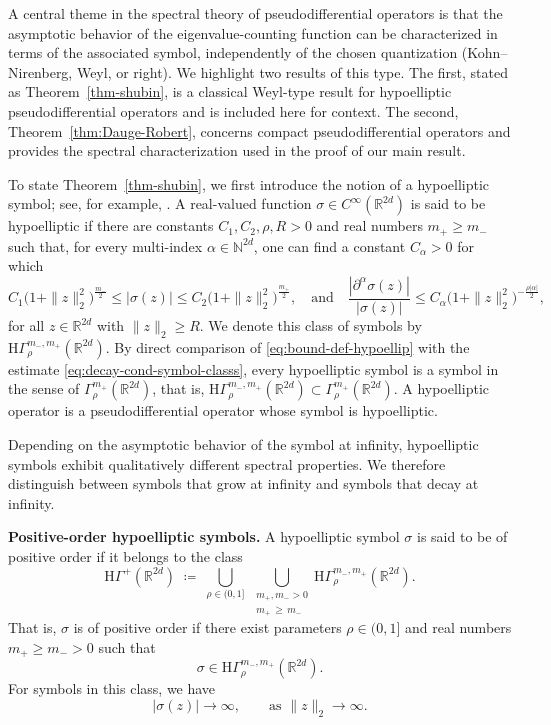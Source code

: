 \documentclass[a4paper,12pt]{article}
\newcommand{\N}{\mathbb{N}}
\newcommand{\R}{\mathbb{R}}
\newcommand{\hyposymbclass}{\text{H}\Gamma^{m_-,m_+}_\rho}
\newcommand{\hypoposclass}{\mathrm{H}\Gamma^+}
\begin{document}
A central theme in the spectral theory of pseudodifferential operators is that the
asymptotic behavior of the eigenvalue-counting function can be characterized in
terms of the associated symbol, independently of the chosen quantization
(Kohn--Nirenberg, Weyl, or right).
We highlight two results of this type.
The first, stated as Theorem~\ref{thm-shubin}, is a classical Weyl-type result for
hypoelliptic pseudodifferential operators and is included here for context.
The second, Theorem~\ref{thm:Dauge-Robert}, concerns compact pseudodifferential
operators and provides the spectral characterization used in the proof of our
main result.

To state Theorem~\ref{thm-shubin}, we first introduce the notion of a
hypoelliptic symbol; see, for example,
\cite[Definition~25.1]{shubin_pseudodifferential_2001}.
A real-valued function $\sigma\in C^\infty(\R^{2d})$ is said to be hypoelliptic if
there are constants $C_1,C_2,\rho,R>0$ and real numbers $m_+\ge m_-$ such that,
for every multi-index $\alpha\in\N^{2d}$, one can find a constant $C_\alpha>0$
for which
\begin{equation}\label{eq:bound-def-hypoellip}
    C_1\bigl(1+\|z\|_2^2\bigr)^{\frac{m_-}{2}}
    \le
    |\sigma(z)|
    \le
    C_2\bigl(1+\|z\|_2^2\bigr)^{\frac{m_+}{2}},
    \quad\text{and}\quad
    \frac{|\partial^\alpha\sigma(z)|}{|\sigma(z)|}
    \le
    C_\alpha\bigl(1+\|z\|_2^2\bigr)^{-\frac{\rho|\alpha|}{2}},
\end{equation}
for all $z\in\R^{2d}$ with $\|z\|_2\ge R$.
We denote this class of symbols by $\hyposymbclass(\R^{2d})$.
By direct comparison of \eqref{eq:bound-def-hypoellip} with the estimate
\eqref{eq:decay-cond-symbol-classs}, every hypoelliptic symbol is a symbol in the
sense of $\Gamma_\rho^{m_+}(\R^{2d})$, that is,
$\hyposymbclass(\R^{2d})\subset\Gamma_\rho^{m_+}(\R^{2d})$.
A hypoelliptic operator is a pseudodifferential operator whose symbol is hypoelliptic.


Depending on the asymptotic behavior of the symbol at infinity,
hypoelliptic symbols exhibit qualitatively different spectral properties.
We therefore distinguish between symbols that grow at infinity and symbols
that decay at infinity.


\medskip

\noindent
\textbf{Positive-order hypoelliptic symbols.}
A hypoelliptic symbol $\sigma$ is said to be of positive order if it belongs
to the class
\[
\hypoposclass(\R^{2d})
\;\coloneqq\;
\bigcup_{\rho\in(0,1]}
\ \bigcup_{\substack{m_+,m_->0\\ m_+\,\ge\, m_-}}
\mathrm{H}\Gamma^{m_-,m_+}_\rho(\R^{2d}).
\]
That is, $\sigma$ is of positive order if there exist parameters $\rho\in(0,1]$
and real numbers $m_+\ge m_->0$ such that
\[
\sigma \in \mathrm{H}\Gamma^{m_-,m_+}_\rho(\R^{2d}).
\]
For symbols in this class, we have
\[
|\sigma(z)| \to \infty,
\qquad \text{as } \|z\|_2 \to \infty.
\]
\end{document}
